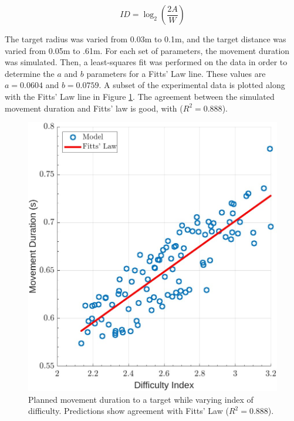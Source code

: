 \documentclass[letterpaper, 10pt, conference]{ieeeconf}
\begin{document}
\begin{equation}
    ID = \log_2 \left(\frac{2A}{W}\right) \label{eq:DifficultyIndex}
\end{equation}

\par The target radius was varied from 0.03m to 0.1m, and the target distance was varied from 0.05m to .61m. For each set of parameters, the movement duration was simulated. Then, a least-squares fit was performed on the data in order to determine the \(a\) and \(b\) parameters for a Fitts' Law line. These values are \(a = 0.0604\) and \(b = 0.0759\). A subset of the experimental data is plotted along with the Fitts' Law line in Figure \ref{fig:FittsLaw}. The agreement between the simulated movement duration and Fitts' law is good, with ($R^2 = 0.888$). 

\begin{figure}[h]
    \centering
    \includegraphics[width=0.8\linewidth]{images/final_fitts_law_single.jpg}
    \caption{Planned movement duration to a target while varying index of difficulty. Predictions show agreement with Fitts' Law ($R^2 = 0.888$).}
    \label{fig:FittsLaw}
\end{figure}
\end{document}
